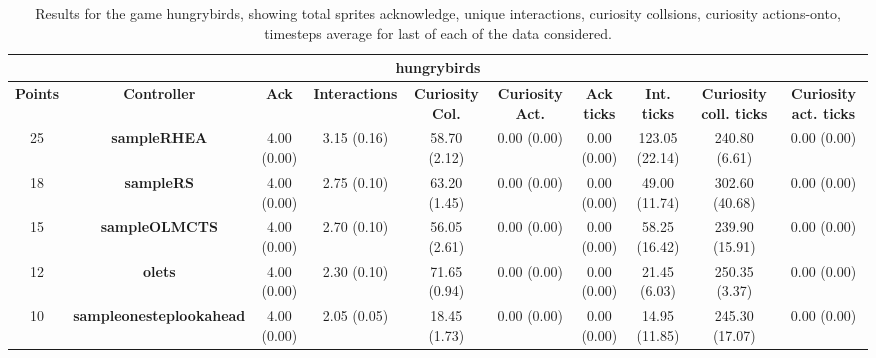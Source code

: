 \begin{table*}[!t]
\begin{center}
\begin{adjustbox}{width=1\textwidth}
\begin{tabular}{|c|c|c|c|c|c|c|c|c|c|}
\multicolumn{10}{c}{\textbf{hungrybirds}}\\
\hline
\textbf{Points} & \textbf{Controller} & \textbf{Ack} & \textbf{Interactions} & \textbf{Curiosity Col.} & \textbf{Curiosity Act.} & \textbf{Ack ticks} & \textbf{Int. ticks} & \textbf{Curiosity coll. ticks} & \textbf{Curiosity act. ticks}\\
\hline
25 & \textbf{sampleRHEA} & 4.00 (0.00) & 3.15 (0.16) & 58.70 (2.12) & 0.00 (0.00) & 0.00 (0.00) & 123.05 (22.14) & 240.80 (6.61) & 0.00 (0.00)
 \\
\hline
18 & \textbf{sampleRS} & 4.00 (0.00) & 2.75 (0.10) & 63.20 (1.45) & 0.00 (0.00) & 0.00 (0.00) & 49.00 (11.74) & 302.60 (40.68) & 0.00 (0.00)
 \\
\hline
15 & \textbf{sampleOLMCTS} & 4.00 (0.00) & 2.70 (0.10) & 56.05 (2.61) & 0.00 (0.00) & 0.00 (0.00) & 58.25 (16.42) & 239.90 (15.91) & 0.00 (0.00)
 \\
\hline
12 & \textbf{olets} & 4.00 (0.00) & 2.30 (0.10) & 71.65 (0.94) & 0.00 (0.00) & 0.00 (0.00) & 21.45 (6.03) & 250.35 (3.37) & 0.00 (0.00)
 \\
\hline
10 & \textbf{sampleonesteplookahead} & 4.00 (0.00) & 2.05 (0.05) & 18.45 (1.73) & 0.00 (0.00) & 0.00 (0.00) & 14.95 (11.85) & 245.30 (17.07) & 0.00 (0.00)
 \\
\hline
\end{tabular}
\end{adjustbox}
\caption{Results for the game hungrybirds, showing total sprites acknowledge, unique interactions, curiosity collsions, curiosity actions-onto, timesteps average for last of each of the data considered.}
\label{tab:weights}
\end{center}
\end{table*}
